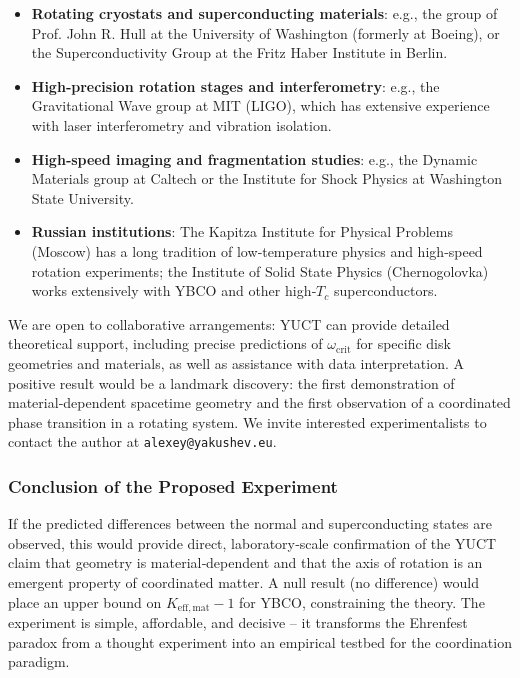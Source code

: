 \documentclass[12pt,a4paper]{article}
\begin{document}
\begin{itemize}
	\item \textbf{Rotating cryostats and superconducting materials}: e.g., the group of Prof. John R. Hull at the University of Washington (formerly at Boeing), or the Superconductivity Group at the Fritz Haber Institute in Berlin.
	\item \textbf{High‑precision rotation stages and interferometry}: e.g., the Gravitational Wave group at MIT (LIGO), which has extensive experience with laser interferometry and vibration isolation.
	\item \textbf{High‑speed imaging and fragmentation studies}: e.g., the Dynamic Materials group at Caltech or the Institute for Shock Physics at Washington State University.
	\item \textbf{Russian institutions}: The Kapitza Institute for Physical Problems (Moscow) has a long tradition of low‑temperature physics and high‑speed rotation experiments; the Institute of Solid State Physics (Chernogolovka) works extensively with YBCO and other high‑\(T_c\) superconductors.
\end{itemize}

We are open to collaborative arrangements: YUCT can provide detailed theoretical support, including precise predictions of \(\omega_{\text{crit}}\) for specific disk geometries and materials, as well as assistance with data interpretation. A positive result would be a landmark discovery: the first demonstration of material‑dependent spacetime geometry and the first observation of a coordinated phase transition in a rotating system. We invite interested experimentalists to contact the author at \texttt{alexey@yakushev.eu}.

\subsubsection{Conclusion of the Proposed Experiment}

If the predicted differences between the normal and superconducting states are observed, this would provide direct, laboratory‑scale confirmation of the YUCT claim that geometry is material‑dependent and that the axis of rotation is an emergent property of coordinated matter. A null result (no difference) would place an upper bound on \(K_{\mathrm{eff,mat}} - 1\) for YBCO, constraining the theory. The experiment is simple, affordable, and decisive – it transforms the Ehrenfest paradox from a thought experiment into an empirical testbed for the coordination paradigm.
\end{document}
